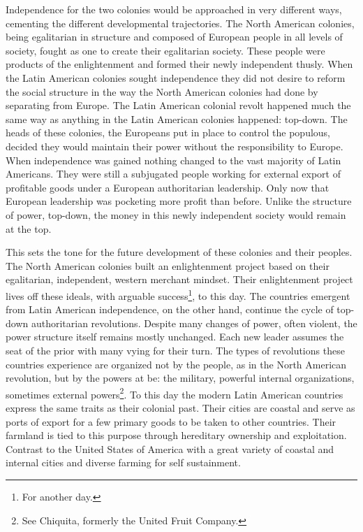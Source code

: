 \documentclass[a4paper, 12pt]{article}
\begin{document}
Independence for the two colonies would be approached in very different ways, cementing the different developmental trajectories. The North American colonies, being egalitarian in structure and composed of European people in all levels of society, fought as one to create their egalitarian society. These people were products of the enlightenment and formed their newly independent thusly. When the Latin American colonies sought independence they did not desire to reform the social structure in the way the North American colonies had done by separating from Europe. The Latin American colonial revolt happened much the same way as anything in the Latin American colonies happened: top-down. The heads of these colonies, the Europeans put in place to control the populous, decided they would maintain their power without the responsibility to Europe. When independence was gained nothing changed to the vast majority of Latin Americans. They were still a subjugated people working for external export of profitable goods under a European authoritarian leadership. Only now that European leadership was pocketing more profit than before. Unlike the structure of power, top-down, the money in this newly independent society would remain at the top.

This sets the tone for the future development of these colonies and their peoples. The North American colonies built an enlightenment project based on their egalitarian, independent, western merchant mindset. Their enlightenment project lives off these ideals, with arguable success\footnote{For another day.}, to this day. The countries emergent from Latin American independence, on the other hand, continue the cycle of top-down authoritarian revolutions. Despite many changes of power, often violent, the power structure itself remains mostly unchanged. Each new leader assumes the seat of the prior with many vying for their turn. The types of revolutions these countries experience are organized not by the people, as in the North American revolution, but by the powers at be: the military, powerful internal organizations, sometimes external powers\footnote{See Chiquita, formerly the United Fruit Company.}. To this day the modern Latin American countries express the same traits as their colonial past. Their cities are coastal and serve as ports of export for a few primary goods to be taken to other countries. Their farmland is tied to this purpose through hereditary ownership and exploitation. Contrast to the United States of America with a great variety of coastal and internal cities and diverse farming for self sustainment.
\end{document}
